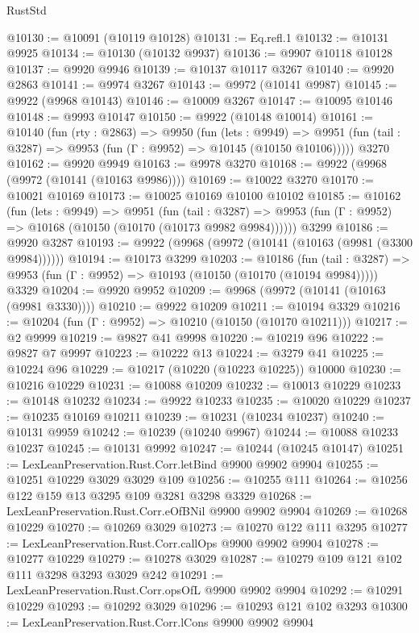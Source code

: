 \begin{lexlean}{RustStd}
\begin{coremodule}
@10130 := @10091 (@10119 @10128)
@10131 := Eq.refl.{1}
@10132 := @10131 @9925
@10134 := @10130 (@10132 @9937)
@10136 := @9907 @10118 @10128
@10137 := @9920 @9946
@10139 := @10137 @10117 @3267
@10140 := @9920 @2863
@10141 := @9974 @3267
@10143 := @9972 (@10141 @9987)
@10145 := @9922 (@9968 @10143)
@10146 := @10009 @3267
@10147 := @10095 @10146
@10148 := @9993 @10147
@10150 := @9922 (@10148 @10014)
@10161 := @10140
    (fun (rty : @2863) =>
    @9950
      (fun (lets : @9949) =>
      @9951 (fun (tail : @3287) => @9953 (fun (Γ : @9952) => @10145 (@10150 @10106)))))
    @3270
@10162 := @9920 @9949
@10163 := @9978 @3270
@10168 := @9922 (@9968 (@9972 (@10141 (@10163 @9986))))
@10169 := @10022 @3270
@10170 := @10021 @10169
@10173 := @10025 @10169 @10100 @10102
@10185 := @10162
    (fun (lets : @9949) =>
    @9951
      (fun (tail : @3287) =>
      @9953 (fun (Γ : @9952) => @10168 (@10150 (@10170 (@10173 @9982 @9984))))))
    @3299
@10186 := @9920 @3287
@10193 := @9922 (@9968 (@9972 (@10141 (@10163 (@9981 (@3300 @9984))))))
@10194 := @10173 @3299
@10203 := @10186
    (fun (tail : @3287) => @9953 (fun (Γ : @9952) => @10193 (@10150 (@10170 (@10194 @9984)))))
    @3329
@10204 := @9920 @9952
@10209 := @9968 (@9972 (@10141 (@10163 (@9981 @3330))))
@10210 := @9922 @10209
@10211 := @10194 @3329
@10216 := @10204 (fun (Γ : @9952) => @10210 (@10150 (@10170 @10211)))
@10217 := @2 @9999
@10219 := @9827 @41 @9998
@10220 := @10219 @96
@10222 := @9827 @7 @9997
@10223 := @10222 @13
@10224 := @3279 @41
@10225 := @10224 @96
@10229 := @10217 (@10220 (@10223 @10225)) @10000
@10230 := @10216 @10229
@10231 := @10088 @10209
@10232 := @10013 @10229
@10233 := @10148 @10232
@10234 := @9922 @10233
@10235 := @10020 @10229
@10237 := @10235 @10169 @10211
@10239 := @10231 (@10234 @10237)
@10240 := @10131 @9959
@10242 := @10239 (@10240 @9967)
@10244 := @10088 @10233 @10237
@10245 := @10131 @9992
@10247 := @10244 (@10245 @10147)
@10251 := LexLeanPreservation.Rust.Corr.letBind @9900 @9902 @9904
@10255 := @10251 @10229 @3029 @3029 @109
@10256 := @10255 @111
@10264 := @10256 @122 @159 @13 @3295 @109 @3281 @3298 @3329
@10268 := LexLeanPreservation.Rust.Corr.eOfBNil @9900 @9902 @9904
@10269 := @10268 @10229
@10270 := @10269 @3029
@10273 := @10270 @122 @111 @3295
@10277 := LexLeanPreservation.Rust.Corr.callOps @9900 @9902 @9904
@10278 := @10277 @10229
@10279 := @10278 @3029
@10287 := @10279 @109 @121 @102 @111 @3298 @3293 @3029 @242
@10291 := LexLeanPreservation.Rust.Corr.opsOfL @9900 @9902 @9904
@10292 := @10291 @10229
@10293 := @10292 @3029
@10296 := @10293 @121 @102 @3293
@10300 := LexLeanPreservation.Rust.Corr.lCons @9900 @9902 @9904

\end{coremodule}
\end{lexlean}
